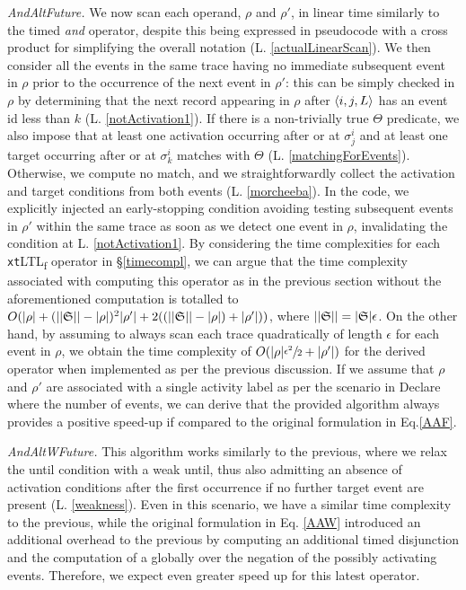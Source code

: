 \documentclass[sigconf]{acmart}
\begin{document}
\textit{AndAltFuture.} We now scan each operand, $\rho$ and $\rho'$, in linear time similarly to the timed \textit{and} operator, despite this being expressed in pseudocode with a cross product for simplifying the overall notation (L. \ref{actualLinearScan}). We then consider all the events in the same trace having no immediate subsequent event in $\rho$ prior to the occurrence of the next event in $\rho'$: this can be simply checked in $\rho$ by determining that the next record appearing in $\rho$ after $\braket{i,j,L}$ has an event id less than $k$ (L. \ref{notActivation1}). If there is a non-trivially true $\Theta$ predicate, we also impose that at least one activation occurring after or at $\sigma^i_j$ and at least one target occurring after or at $\sigma^i_k$ matches with $\Theta$ (L. \ref{matchingForEvents}). Otherwise, we compute no match, and we straightforwardly collect the activation and target conditions from both events (L. \ref{morcheeba}). In the code, we explicitly injected an early-stopping condition avoiding testing subsequent events in $\rho'$ within the same trace as soon as we detect one event in $\rho$, invalidating the condition at L. \ref{notActivation1}. By considering the time complexities for each \texttt{xt}LTL\textsubscript{f} operator in \S\ref{timecompl}, we can argue that the time complexity associated with computing this operator as in the previous section without the aforementioned computation is totalled to $O(|\rho|+(||\mathfrak{S}||-|\rho|)^2|\rho'|+2((||\mathfrak{S}||-|\rho|)+|\rho'|))$, where $||\mathfrak{S}||=|\mathfrak{S}|\epsilon$. On the other hand, by assuming to always scan each trace quadratically of length $\epsilon$ for each event in $\rho$, we obtain the time complexity of $O(|\rho|\sfrac{\epsilon^2}{2}+|\rho'|)$ for the derived operator when implemented as per the previous discussion. If we assume that $\rho$ and $\rho'$ are associated with a single activity label as per the scenario in Declare where the number of events, we can derive that the provided algorithm always provides a positive speed-up if compared to the original formulation in Eq.\ref{AAF}. \medskip

\textit{AndAltWFuture.} This algorithm works similarly to the previous, where we relax the until condition with a weak until, thus also admitting an absence of activation conditions after the first occurrence if no further target event are present (L. \ref{weakness}). Even in this scenario, we have a similar time complexity to the previous, while the original formulation in Eq. \ref{AAW} introduced an additional overhead to the previous by computing an additional timed disjunction and the computation of a globally over the negation of the possibly activating events. Therefore, we expect even greater speed up for this latest operator.   \medskip
\end{document}
